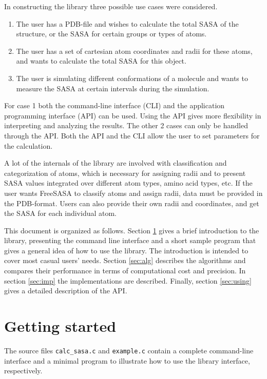 \documentclass[a4paper,11pt]{article}
\begin{document}
In constructing the library three possible use cases were considered. 
\begin{enumerate}
\item The user has a PDB-file and wishes to calculate the total SASA of
  the structure, or the SASA for certain groups or types of atoms.
\item The user has a set of cartesian atom coordinates and radii for
  these atoms, and wants to calculate the total SASA for this object.
\item The user is simulating different conformations of a molecule and
  wants to measure the SASA at certain intervals during the simulation.
\end{enumerate}
For case 1 both the command-line interface (CLI) and the application
programming interface (API) can be used. Using the API gives more
flexibility in interpreting and analyzing the results. The other 2
cases can only be handled through the API. Both the API and the CLI
allow the user to set parameters for the calculation. 

A lot of the internals of the library are involved with classification
and categorization of atoms, which is necessary for assigning radii
and to present SASA values integrated over different atom types, amino
acid types, etc. If the user wants FreeSASA to classify atoms and
assign radii, data must be provided in the PDB-format. Users can also
provide their own radii and coordinates, and get the SASA for each
individual atom.

This document is organized as follows. Section \ref{sec:howto_short}
gives a brief introduction to the library, presenting the command line
interface and a short sample program that gives a general idea of how
to use the library. The introduction is intended to cover most casual
users' needs. Section \ref{sec:alg} describes the algorithms and
compares their performance in terms of computational cost and
precision. In section \ref{sec:imp} the implementations are
described. Finally, section \ref{sec:using} gives a detailed
description of the API.

\section{Getting started}\label{sec:howto_short}

The source files \texttt{calc\_sasa.c} and \texttt{example.c} contain
a complete command-line interface and a minimal program to illustrate
how to use the library interface, respectively. 
\end{document}
